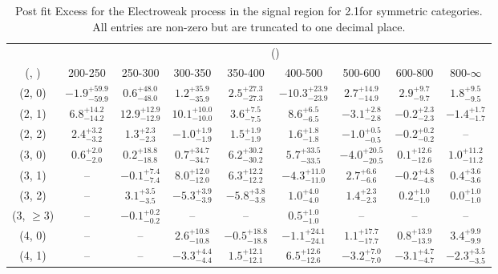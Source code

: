 \begin{table}[h!]
\tiny
\centering
\caption{Post fit Excess for the Electroweak process in the signal region for 2.1\ifb for symmetric categories. All entries are non-zero but are truncated to one decimal place.\label{tab:excessseppost_sig_ewk_sym}}
\begin{tabular}
{ccccccccc}
	\hline\hline
	& \multicolumn{8}{c}{\scalht (\gev)} \\ 
	 (\njet,  \nb) & 200-250 & 250-300 & 300-350 & 350-400 & 400-500 & 500-600 & 600-800 & 800-$\infty$ \\ [0.8ex] 
\hline
	(2, 0) & $-1.9^{+ 59.9 }_{- 59.9 }$ & $0.6^{+ 48.0 }_{- 48.0 }$ & $1.2^{+ 35.9 }_{- 35.9 }$ & $2.5^{+ 27.3 }_{- 27.3 }$ & $-10.3^{+ 23.9 }_{- 23.9 }$ & $2.7^{+ 14.9 }_{- 14.9 }$ & $2.9^{+ 9.7 }_{- 9.7 }$ & $1.8^{+ 9.5 }_{- 9.5 }$ \\[0.5ex] 
	(2, 1) & $6.8^{+ 14.2 }_{- 14.2 }$ & $12.9^{+ 12.9 }_{- 12.9 }$ & $10.1^{+ 10.0 }_{- 10.0 }$ & $3.6^{+ 7.5 }_{- 7.5 }$ & $8.6^{+ 6.5 }_{- 6.5 }$ & $-3.1^{+ 2.8 }_{- 2.8 }$ & $-0.2^{+ 2.3 }_{- 2.3 }$ & $-1.4^{+ 1.7 }_{- 1.7 }$ \\[0.5ex] 
	(2, 2) & $2.4^{+ 3.2 }_{- 3.2 }$ & $1.3^{+ 2.3 }_{- 2.3 }$ & $-1.0^{+ 1.9 }_{- 1.9 }$ & $1.5^{+ 1.9 }_{- 1.9 }$ & $1.6^{+ 1.8 }_{- 1.8 }$ & $-1.0^{+ 0.5 }_{- 0.5 }$ & $-0.2^{+ 0.2 }_{- 0.2 }$ & -- \\[0.5ex] 
	(3, 0) & $0.6^{+ 2.0 }_{- 2.0 }$ & $0.2^{+ 18.8 }_{- 18.8 }$ & $0.7^{+ 34.7 }_{- 34.7 }$ & $6.2^{+ 30.2 }_{- 30.2 }$ & $5.7^{+ 33.5 }_{- 33.5 }$ & $-4.0^{+ 20.5 }_{- 20.5 }$ & $0.1^{+ 12.6 }_{- 12.6 }$ & $1.0^{+ 11.2 }_{- 11.2 }$ \\[0.5ex] 
	(3, 1) & -- & $-0.1^{+ 7.4 }_{- 7.4 }$ & $8.0^{+ 12.0 }_{- 12.0 }$ & $6.3^{+ 12.2 }_{- 12.2 }$ & $-4.3^{+ 11.0 }_{- 11.0 }$ & $2.7^{+ 6.6 }_{- 6.6 }$ & $-0.2^{+ 4.8 }_{- 4.8 }$ & $0.4^{+ 3.6 }_{- 3.6 }$ \\[0.5ex] 
	(3, 2) & -- & $3.1^{+ 3.5 }_{- 3.5 }$ & $-5.3^{+ 3.9 }_{- 3.9 }$ & $-5.8^{+ 3.8 }_{- 3.8 }$ & $1.0^{+ 4.0 }_{- 4.0 }$ & $1.4^{+ 2.3 }_{- 2.3 }$ & $0.2^{+ 1.0 }_{- 1.0 }$ & $0.0^{+ 1.0 }_{- 1.0 }$ \\[0.5ex] 
	(3, $\ge3$) & -- & $-0.1^{+ 0.2 }_{- 0.2 }$ & -- & -- & $0.5^{+ 1.0 }_{- 1.0 }$ & -- & -- & -- \\[0.5ex] 
	(4, 0) & -- & -- & $2.6^{+ 10.8 }_{- 10.8 }$ & $-0.5^{+ 18.8 }_{- 18.8 }$ & $-1.1^{+ 24.1 }_{- 24.1 }$ & $1.1^{+ 17.7 }_{- 17.7 }$ & $0.8^{+ 13.9 }_{- 13.9 }$ & $3.4^{+ 9.9 }_{- 9.9 }$ \\[0.5ex] 
	(4, 1) & -- & -- & $-3.3^{+ 4.4 }_{- 4.4 }$ & $1.5^{+ 12.1 }_{- 12.1 }$ & $6.5^{+ 12.6 }_{- 12.6 }$ & $-3.2^{+ 7.0 }_{- 7.0 }$ & $-3.1^{+ 4.7 }_{- 4.7 }$ & $-2.3^{+ 3.5 }_{- 3.5 }$ \\[0.5ex] 

\end{tabular}
\end{table}
